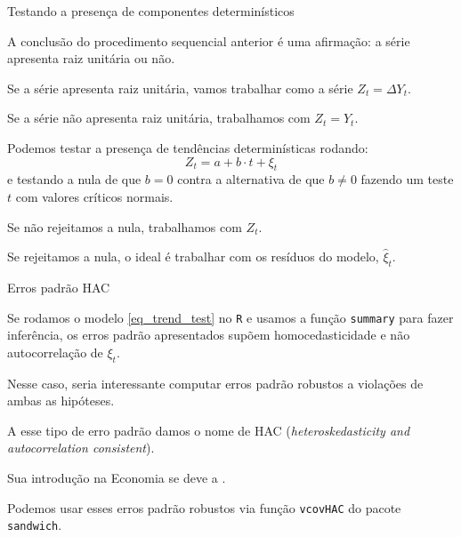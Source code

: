 \documentclass[11pt]{beamer}
\newenvironment{halfwideitemize}{\itemize\addtolength{\itemsep}{0.5em}}{\enditemize}
\begin{document}
\begin{frame}{Testando a presença de componentes determinísticos}
	\begin{halfwideitemize}
		\item A conclusão do procedimento sequencial anterior é uma afirmação: a série apresenta raiz unitária ou não.
		\item Se a série apresenta raiz unitária, vamos trabalhar como a série $Z_t = \Delta Y_t$.
		\item Se a série não apresenta raiz unitária, trabalhamos com $Z_t = Y_t$.
		\item Podemos testar a presença de tendências determinísticas rodando:
		\begin{equation}
			\label{eq_trend_test}
			Z_t = a + b \cdot t + \xi_t
		\end{equation}
		e testando a nula de que $b=0$ contra a alternativa de que $b \neq 0$ fazendo um teste $t$ com valores críticos normais.
		\begin{halfwideitemize}
			\item Se não rejeitamos a nula, trabalhamos com $Z_t$.
			\item Se rejeitamos a nula, o ideal é trabalhar com os resíduos do modelo, $\hat{\xi}_t$.
		\end{halfwideitemize}
	\end{halfwideitemize}
\end{frame}

\begin{frame}{Erros padrão HAC}
	\begin{halfwideitemize}
		\item Se rodamos o modelo \eqref{eq_trend_test} no \texttt{R} e usamos a função \texttt{summary} para fazer inferência, os erros padrão apresentados supõem homocedasticidade e não autocorrelação de $\xi_t$.
		\item Nesse caso, seria interessante computar erros padrão robustos a violações de ambas as hipóteses.
		\begin{halfwideitemize}
			\item A esse tipo de erro padrão damos o nome de HAC (\textit{heteroskedasticity and autocorrelation consistent}).
			\item Sua introdução na Economia se deve a \citet{Newey1987}.
		\end{halfwideitemize}
		\item Podemos usar esses erros padrão robustos via função \texttt{vcovHAC} do pacote \texttt{sandwich}.
	\end{halfwideitemize}
\end{frame}
\end{document}
